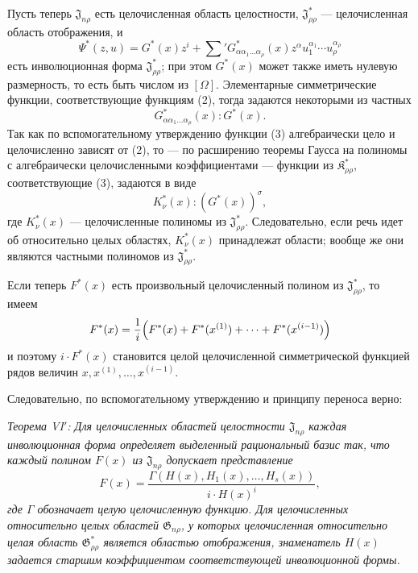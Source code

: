\documentclass[11pt]{article}
\providecommand{\Kfield}{\mathfrak{K}}
\providecommand{\Jdom}{\mathfrak{J}}
\providecommand{\Gdom}{\mathfrak{G}}
\begin{document}
Пусть теперь $\Jdom_{n\rho}$ есть целочисленная область целостности, $\Jdom^*_{\rho\rho}$ --- целочисленная область отображения, и
\[
  \Psi^*(z,u)=G^*(x)z^i+
  \sum{}'G^*_{\alpha\alpha_1\ldots\alpha_\rho}(x)
  z^\alpha u_1^{\alpha_1}\cdots u_\rho^{\alpha_\rho}
\]
есть инволюционная форма $\Jdom^*_{\rho\rho}$; при этом $G^*(x)$ может также иметь нулевую размерность, то есть быть числом из $[\Omega]$. Элементарные симметрические функции, соответствующие функциям (2), тогда задаются некоторыми из частных
\begin{equation}
  G^*_{\alpha\alpha_1\ldots\alpha_\rho}(x):G^*(x).
\tag{4}
\end{equation}
Так как по вспомогательному утверждению функции (3) алгебраически цело и целочисленно зависят от (2), то --- по расширению теоремы Гаусса на полиномы с алгебраически целочисленными коэффициентами --- функции из $\Kfield^*_{\rho\rho}$, соответствующие (3), задаются в виде
\begin{equation}
  K_\nu^*(x):(G^*(x))^\sigma,
\tag{5}
\end{equation}
где $K_\nu^*(x)$ --- целочисленные полиномы из $\Jdom^*_{\rho\rho}$. Следовательно, если речь идет об относительно целых областях, $K_\nu^*(x)$ принадлежат области; вообще же они являются частными полиномов из $\Jdom^*_{\rho\rho}$.

Если теперь $F^*(x)$ есть произвольный целочисленный полином из $\Jdom^*_{\rho\rho}$, то имеем
\[
  F^*(x)=\frac1i\Bigl(F^*(x)+F^*(x^{(1)})+\cdots+F^*(x^{(i-1)})\Bigr)
\]
и поэтому $i\cdot F^*(x)$ становится целой целочисленной симметрической функцией рядов величин $x,x^{(1)},\ldots,x^{(i-1)}$.

Следовательно, по вспомогательному утверждению и принципу переноса верно:

\emph{Теорема VI$'$: Для целочисленных областей целостности $\Jdom_{n\rho}$ каждая инволюционная форма определяет выделенный рациональный базис так, что каждый полином $F(x)$ из $\Jdom_{n\rho}$ допускает представление}
\[
  F(x)=\frac{\Gamma(H(x),H_1(x),\ldots,H_s(x))}{i\cdot H(x)^i},
\]
\emph{где $\Gamma$ обозначает целую целочисленную функцию. Для целочисленных относительно целых областей $\Gdom_{n\rho}$, у которых целочисленная относительно целая область $\Gdom^*_{\rho\rho}$ является областью отображения, знаменатель $H(x)$ задается старшим коэффициентом соответствующей инволюционной формы.}
\end{document}
